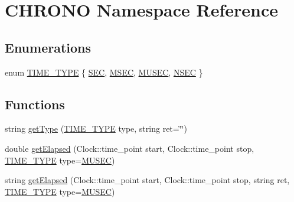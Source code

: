\hypertarget{namespace_c_h_r_o_n_o}{}\section{C\+H\+R\+O\+NO Namespace Reference}
\label{namespace_c_h_r_o_n_o}
\subsection*{Enumerations}
\begin{DoxyCompactItemize}
\item 
enum \mbox{\hyperlink{namespace_c_h_r_o_n_o_a246e471488a6e6b17ddb86e3b817c7d9}{T\+I\+M\+E\+\_\+\+T\+Y\+PE}} \{ \mbox{\hyperlink{namespace_c_h_r_o_n_o_a246e471488a6e6b17ddb86e3b817c7d9ac09415dca4fa7975506ab664d88b403a}{S\+EC}}, 
\mbox{\hyperlink{namespace_c_h_r_o_n_o_a246e471488a6e6b17ddb86e3b817c7d9a2060724ab75592144c0b930e3394d845}{M\+S\+EC}}, 
\mbox{\hyperlink{namespace_c_h_r_o_n_o_a246e471488a6e6b17ddb86e3b817c7d9aba8c3a9d281e3b934b74d5ff97a3a093}{M\+U\+S\+EC}}, 
\mbox{\hyperlink{namespace_c_h_r_o_n_o_a246e471488a6e6b17ddb86e3b817c7d9a06ab3311d8f423104c3beae640896013}{N\+S\+EC}}
 \}
\end{DoxyCompactItemize}
\subsection*{Functions}
\begin{DoxyCompactItemize}
\item 
string \mbox{\hyperlink{namespace_c_h_r_o_n_o_ae2a3e41f8bf5f83ba84d3f4d2eed3836}{get\+Type}} (\mbox{\hyperlink{namespace_c_h_r_o_n_o_a246e471488a6e6b17ddb86e3b817c7d9}{T\+I\+M\+E\+\_\+\+T\+Y\+PE}} type, string ret=\char`\"{}\char`\"{})
\item 
double \mbox{\hyperlink{namespace_c_h_r_o_n_o_aebe2329c142a6f06b6fede41c3abf1b3}{get\+Elapsed}} (Clock\+::time\+\_\+point start, Clock\+::time\+\_\+point stop, \mbox{\hyperlink{namespace_c_h_r_o_n_o_a246e471488a6e6b17ddb86e3b817c7d9}{T\+I\+M\+E\+\_\+\+T\+Y\+PE}} type=\mbox{\hyperlink{namespace_c_h_r_o_n_o_a246e471488a6e6b17ddb86e3b817c7d9aba8c3a9d281e3b934b74d5ff97a3a093}{M\+U\+S\+EC}})
\item 
string \mbox{\hyperlink{namespace_c_h_r_o_n_o_ad8da7180c420d59f4c0077b60579c0ae}{get\+Elapsed}} (Clock\+::time\+\_\+point start, Clock\+::time\+\_\+point stop, string ret, \mbox{\hyperlink{namespace_c_h_r_o_n_o_a246e471488a6e6b17ddb86e3b817c7d9}{T\+I\+M\+E\+\_\+\+T\+Y\+PE}} type=\mbox{\hyperlink{namespace_c_h_r_o_n_o_a246e471488a6e6b17ddb86e3b817c7d9aba8c3a9d281e3b934b74d5ff97a3a093}{M\+U\+S\+EC}})
\end{DoxyCompactItemize}


